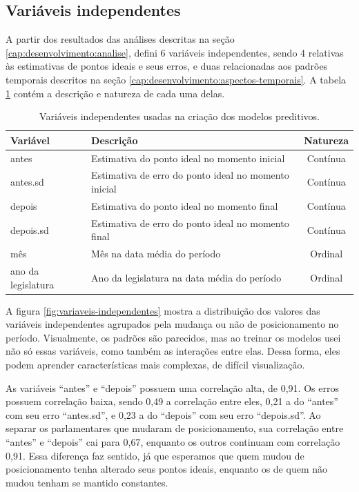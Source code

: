 \documentclass[a4paper,titlepage]{ppgi}\usepackage[]{graphicx}\usepackage[]{color}
\begin{document}
\subsection{Variáveis independentes}
\label{cap:desenvolvimento:variaveis-independentes}

A partir dos resultados das análises descritas na seção
\ref{cap:desenvolvimento:analise}, defini 6 variáveis independentes, sendo 4 relativas
às estimativas de pontos ideais e seus erros, e duas relacionadas aos padrões
temporais descritos na seção \ref{cap:desenvolvimento:aspectos-temporais}. A tabela
\ref{table:variaveis-independentes} contém a descrição e natureza de cada uma
delas.

\begin{table}
\centering
\begin{tabular}{l l c}
  Variável & Descrição & Natureza \\
  \hline
  antes & Estimativa do ponto ideal no momento inicial & Contínua \\
  antes.sd & Estimativa de erro do ponto ideal no momento inicial& Contínua \\
  depois & Estimativa do ponto ideal no momento final & Contínua \\
  depois.sd & Estimativa de erro do ponto ideal no momento final & Contínua \\
  mês & Mês na data média do período & Ordinal \\
  ano da legislatura & Ano da legislatura na data média do período & Ordinal \\
\end{tabular}
\caption{Variáveis independentes usadas na criação dos modelos preditivos.}
\label{table:variaveis-independentes}
\end{table}

A figura \ref{fig:variaveis-independentes} mostra a distribuição dos valores das
variáveis independentes agrupados pela mudança ou não de posicionamento no
período. Visualmente, os padrões são parecidos, mas ao treinar os modelos usei
não só essas variáveis, como também as interações entre elas. Dessa forma, eles
podem aprender características mais complexas, de difícil visualização.

As variáveis ``antes'' e ``depois'' possuem uma correlação alta, de
0,91. Os erros possuem correlação baixa, sendo
0,49 a correlação entre eles,
0,21 a do ``antes'' com seu erro
``antes.sd'', e 0,23 a do ``depois'' com seu
erro ``depois.sd''. Ao separar os parlamentares que mudaram de posicionamento,
sua correlação entre ``antes'' e ``depois'' cai para
0,67, enquanto os outros continuam com
correlação 0,91. Essa diferença faz sentido, já
que esperamos que quem mudou de posicionamento tenha alterado seus pontos
ideais, enquanto os de quem não mudou tenham se mantido constantes.
\end{document}

